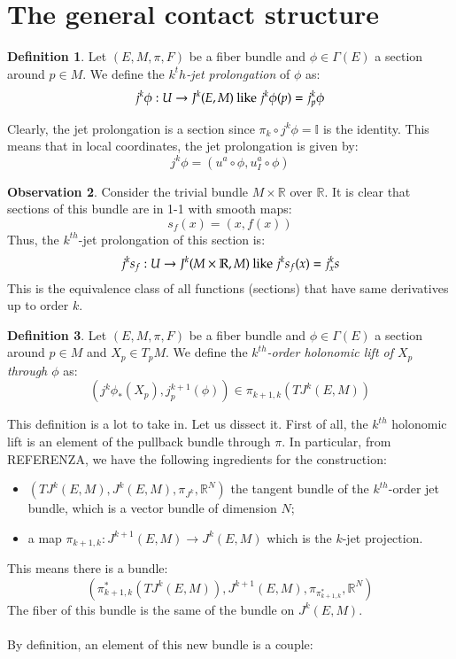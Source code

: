 \documentclass[12pt,a4paper]{report}
\theoremstyle{definition}
\newtheorem{Def}{Definition}[chapter]
\theoremstyle{Theorem}
\theoremstyle{break}
\theoremstyle{definition}
\newtheorem{Obs}[Def]{Observation}
\begin{document}
	\section{The general contact structure}
		\begin{Def}
			Let $(E,M,\pi,F)$ be a fiber bundle and $\phi\in\Gamma(E)$ a section around $p\in M$. We define the \textit{$k^th$-jet prolongation} of $\phi$ as:
			$$j^k\phi:U\rightarrow J^k(E,M)\hbox{ like }j^k\phi(p)=j^k_p\phi$$ 
		\end{Def}
		Clearly, the jet prolongation is a section since $\pi_k\circ j^k\phi=\mathbb{I}$ is the identity. This means that in local coordinates, the jet prolongation is given by:
		$$j^k\phi=(u^a\circ \phi,u^a_I\circ \phi)$$
		\begin{Obs}
			Consider the trivial bundle $M\times \mathbb{R}$ over $\mathbb{R}$. It is clear that sections of this bundle are in 1-1 with smooth maps:
			$$s_f(x)=(x,f(x))$$
			Thus, the $k^{th}$-jet prolongation of this section is:
			$$j^ks_f:U\rightarrow J^k(M\times \mathbb{R},M)\hbox{ like }j^ks_f(x)=j^k_xs$$
			This is the equivalence class of all functions (sections) that have same derivatives up to order $k$.
		\end{Obs}
		\begin{Def}
			Let $(E,M,\pi,F)$ be a fiber bundle and $\phi\in\Gamma(E)$ a section around $p\in M$ and $X_p\in T_pM$. We define the \textit{$k^{th}$-order holonomic lift of $X_p$ through $\phi$} as:
			$$(j^k\phi_*(X_p),j^{k+1}_p(\phi))\in\pi_{k+1,k}(TJ^k(E,M))$$ 
		\end{Def}
		This definition is a lot to take in. Let us dissect it. First of all, the $k^{th}$ holonomic lift is an element of the pullback bundle through $\pi$. In particular, from REFERENZA, we have the following ingredients for the construction:
		\begin{itemize}
			\item $(TJ^k(E,M),J^k(E,M),\pi_{J^k},\mathbb{R}^N)$ the tangent bundle of the $k^{th}$-order jet bundle, which is a vector bundle of dimension $N$;
			\item a map $\pi_{k+1,k}:J^{k+1}(E,M)\rightarrow J^k(E,M)$ which is the $k$-jet projection. 
		\end{itemize}
		This means there is a bundle:
		$$(\pi_{k+1,k}^*(TJ^k(E,M)),J^{k+1}(E,M),\pi_{\pi_{k+1,k}^*},\mathbb{R}^N)$$
		The fiber of this bundle is the same of the bundle on $J^k(E,M)$.\\
		\\
		By definition, an element of this new bundle is a couple:
\end{document}
